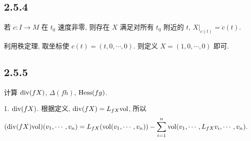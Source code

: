 \subsection{2.5.4}
\begin{problem}
    若 $c\colon I \rightarrow M$ 在 $t_0$ 速度非零, 则存在 $X$ 满足对所有 $t_0$ 附近的 $t$, $X|_{c(t)} = \dot{c}(t)$.
\end{problem}
\begin{solution}
    利用秩定理, 取坐标使 $c(t) = (t, 0, \cdots, 0)$. 则定义 $X = (1, 0, \cdots, 0)$ 即可.
\end{solution}

\subsection{2.5.5}
\begin{problem}
    计算 $\mathrm{div}(fX)$, $\Delta(fh)$, $\mathrm{Hess}(fg)$.
\end{problem}
\begin{solution}
    1. $\mathrm{div}(fX)$.
    根据定义, $\mathrm{div}(fX) = L_{fX}\mathrm{vol}$, 所以
    \[
        (\mathrm{div}(fX)\mathrm{vol})(v_1, \cdots, v_n) = L_{fX}(\mathrm{vol}(v_1, \cdots, v_n)) - \sum_{i = 1}^{n}\mathrm{vol}(v_1, \cdots, L_{fX}v_i, \cdots, v_n).
    \]
\end{solution}
